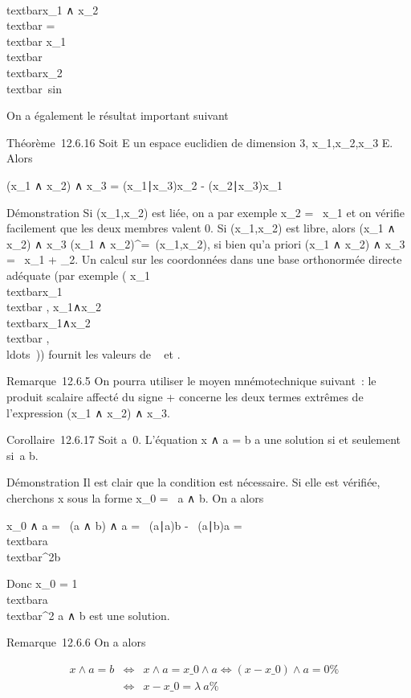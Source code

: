 \documentclass[]{article}
\begin{document}
\\textbar{}x\_1 ∧
x\_2\\textbar{} =\\textbar{}
x\_1\\textbar{}\,\\textbar{}x\_2\\textbar{}\
sin \theta

On a également le résultat important suivant

Théorème~12.6.16 Soit E un espace euclidien de dimension 3,
x\_1,x\_2,x\_3 \in E. Alors

(x\_1 ∧ x\_2) ∧ x\_3 =
(x\_1∣x\_3)x\_2 -
(x\_2∣x\_3)x\_1

Démonstration Si (x\_1,x\_2) est liée, on a par exemple
x\_2 = \lambda~x\_1 et on vérifie facilement que les deux
membres valent 0. Si (x\_1,x\_2) est libre, alors
(x\_1 ∧ x\_2) ∧ x\_3 \in (x\_1 ∧
x\_2)^\bot =\
\mathrmVect(x\_1,x\_2), si bien
qu'a priori (x\_1 ∧ x\_2) ∧ x\_3 = \lambda~x\_1
+ \mux\_2. Un calcul sur les coordonnées dans une base orthonormée
directe adéquate (par exemple ( x\_1 \over
\\textbar{}x\_1\\textbar{} ,
x\_1∧x\_2 \over
\\textbar{}x\_1∧x\_2\\textbar{}
,\\ldots~)) fournit
les valeurs de \lambda~ et \mu.

Remarque~12.6.5 On pourra utiliser le moyen mnémotechnique suivant~: le
produit scalaire affecté du signe + concerne les deux termes extrêmes de
l'expression (x\_1 ∧ x\_2) ∧ x\_3.

Corollaire~12.6.17 Soit a\neq~0. L'équation x ∧ a
= b a une solution si et seulement si~a \bot b.

Démonstration Il est clair que la condition est nécessaire. Si elle est
vérifiée, cherchons x sous la forme x\_0 = \lambda~a ∧ b. On a alors

x\_0 ∧ a = \lambda~(a ∧ b) ∧ a = \lambda~(a∣a)b -
\lambda~(a∣b)a =
\lambda~\\textbar{}a\\textbar{}^2b

Donc x\_0 = 1 \over
\\textbar{}a\\textbar{}^2 a ∧
b est une solution.

Remarque~12.6.6 On a alors

\begin{align*} x ∧ a = b&
\Leftrightarrow & x ∧ a = x\_0 ∧ a
\Leftrightarrow (x - x\_0) ∧ a = 0\%&
\\ & \Leftrightarrow & x -
x\_0 = \lambda~a \%& \\
\end{align*}
\end{document}
